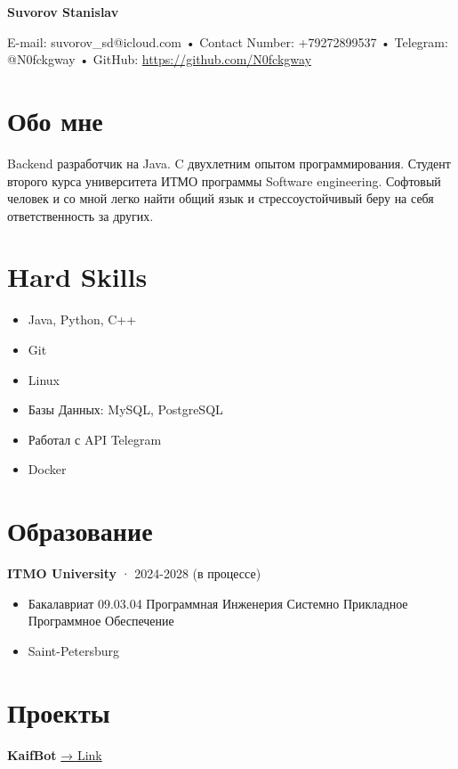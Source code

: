 \documentclass[11pt,a4paper]{article}
\begin{document}
\noindent
{\Huge \textbf{Suvorov Stanislav}}

\vspace{0.4em}
\noindent
E-mail: suvorov\_sd@icloud.com • Contact Number: +79272899537 • Telegram: @N0fckgway • GitHub: \href{https://github.com/N0fckgway}{https://github.com/N0fckgway}

\vspace{1.2em}

\section{Обо мне}
Backend разработчик на Java. C двухлетним опытом программирования. Студент второго курса университета ИТМО программы Software engineering. Софтовый человек и со мной легко найти общий язык и стрессоустойчивый беру на себя ответственность за других.

\section{Hard Skills}
\begin{itemize}[label=+]
    \item Java, Python, C++
    \item Git
    \item Linux
    \item Базы Данных: MySQL, PostgreSQL
    \item Работал с API Telegram
    \item Docker
\end{itemize}

\section{Образование}
\textbf{ITMO University} · 2024-2028 (в процессе)
\begin{itemize}[label=$\bullet$]
    \item Бакалавриат 09.03.04 Программная Инженерия Системно Прикладное Программное Обеспечение
    \item Saint-Petersburg
\end{itemize}

\section{Проекты}

\textbf{KaifBot} \hfill \href{https://github.com/N0fckgway/KaifBot}{→ Link}
\end{document}
